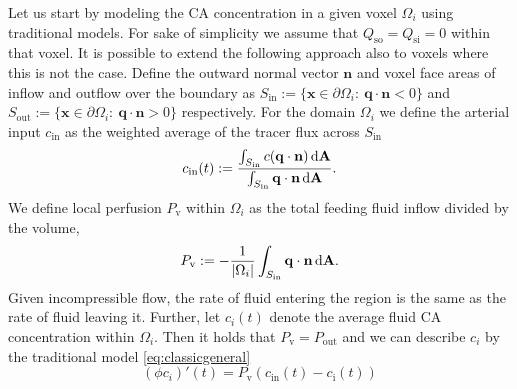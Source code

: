 \documentclass[aps,prb,article,groupedaddress,showkeys]{revtex4}
\begin{document}
	Let us start by modeling the CA concentration in a given voxel $\Omega_i$ using traditional models.
	For sake of simplicity we assume that $Q_{\mathrm{so}} = Q_{\mathrm{si}} = 0$ within that voxel.
	It is possible to extend the following approach also to voxels where this is not the case.
	Define the outward normal vector $\mathbf{n}$ and voxel face areas of inflow and outflow over the boundary as $S_{\mathrm{in}} := \{ \mathbf{x} \in \partial \Omega_i: \ \mathbf{q} \cdot \mathbf{n} < 0 \}$ and $S_{\mathrm{out}}:= \{ \mathbf{x} \in \partial \Omega_i: \ \mathbf{q} \cdot \mathbf{n} > 0 \}$ respectively.
	For the domain $\Omega_i$ we define the arterial input $c_{\mathrm{in}}$ as the weighted average of the tracer flux across $S_{\mathrm{in}}$
	\begin{equation}\label{eq:cin}
	 	c_{\mathrm{in}}(t):= \frac{\int_{S_{\mathrm{in}}}c (\mathbf{q} \cdot \mathbf{n}) \,\mathrm{d} \mathbf{A}}{\int_{S_{\mathrm{in}}} \mathbf{q} \cdot \mathbf{n} \,\mathrm{d} \mathbf{A}}.
	\end{equation}
	We define local perfusion $P_{\mathrm{v}}$ within $\Omega_i$ as the total feeding fluid inflow divided by the volume,
	\begin{equation}\label{eq:perflocal}
		P_{\mathrm{v}} :=-\frac{1}{|\Omega_i|}\int_{S_{\mathrm{in}}} \mathbf{q} \cdot \mathbf{n} \,\mathrm{d} \mathbf{A}.
	\end{equation}
	Given incompressible flow, the rate of fluid entering the region is the same as the rate of fluid leaving it. 
	Further, let $c_i(t)$ denote the average fluid CA concentration within $\Omega_i$.
	Then it holds that $P_{\mathrm{v}}=P_{\mathrm{out}}$ and we can describe $c_i$ by the traditional model \eqref{eq:classicgeneral}
	\begin{equation}\label{eq:singlevoxel}
		(\phi c_i)'(t)  = P_{\mathrm{v}} (c_\mathrm{in}(t)  - c_\mathrm{i}(t))
	\end{equation}
\end{document}
